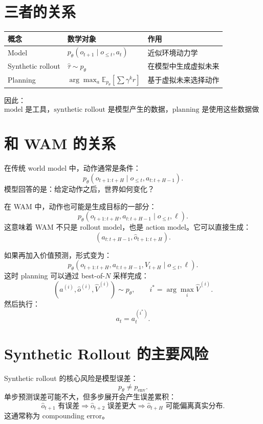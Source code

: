 \documentclass[11pt,a4paper]{ctexart}
\begin{document}
\section{三者的关系}

\begin{center}
\begin{tabular}{lll}
\toprule
概念 & 数学对象 & 作用 \\
\midrule
Model &
$p_\theta(o_{t+1}\mid o_{\le t},a_t)$ &
近似环境动力学 \\
Synthetic rollout &
$\hat{\tau}\sim p_\theta$ &
在模型中生成虚拟未来 \\
Planning &
$\arg\max_a \mathbb{E}_{p_\theta}[\sum \gamma^k r]$ &
基于虚拟未来选择动作 \\
\bottomrule
\end{tabular}
\end{center}

因此：
\[
  \text{model 是工具，synthetic rollout 是模型产生的数据，planning 是使用这些数据做决策的过程。}
\]

\section{和 WAM 的关系}

在传统 world model 中，动作通常是条件：
\[
  p_\theta(o_{t+1:t+H}\mid o_{\le t},a_{t:t+H-1}).
\]
模型回答的是：给定动作之后，世界如何变化？

在 WAM 中，动作也可能是生成目标的一部分：
\[
  p_\theta(o_{t+1:t+H},a_{t:t+H-1}\mid o_{\le t},\ell).
\]
这意味着 WAM 不只是 rollout model，也是 action model。它可以直接生成：
\[
  (a_{t:t+H-1},\hat{o}_{t+1:t+H}).
\]

如果再加入价值预测，形式变为：
\[
  p_\theta(o_{t+1:t+H},a_{t:t+H-1},V_{t+H}\mid o_{\le t},\ell).
\]
这时 planning 可以通过 best-of-$N$ 采样完成：
\[
  (a^{(i)},\hat{o}^{(i)},\hat{V}^{(i)})\sim p_\theta,
  \qquad
  i^*=\arg\max_i \hat{V}^{(i)}.
\]
然后执行：
\[
  a_t=a_t^{(i^*)}.
\]

\section{Synthetic Rollout 的主要风险}

Synthetic rollout 的核心风险是模型误差：
\[
  p_\theta \neq p_{\mathrm{env}}.
\]
单步预测误差可能不大，但多步展开会产生误差累积：
\[
  \hat{o}_{t+1}\text{ 有误差}
  \Rightarrow
  \hat{o}_{t+2}\text{ 误差更大}
  \Rightarrow
  \hat{o}_{t+H}\text{ 可能偏离真实分布}.
\]
这通常称为 compounding error。
\end{document}
